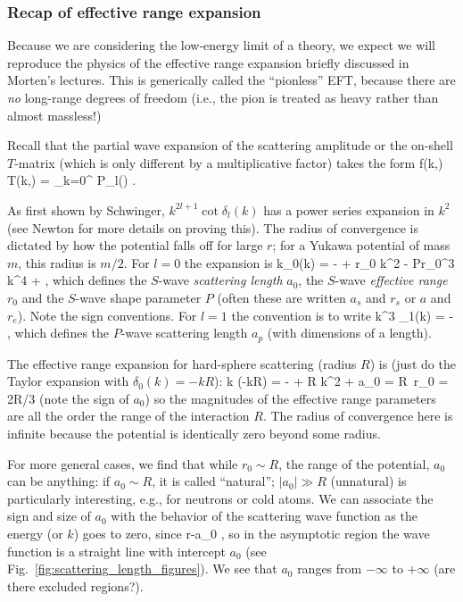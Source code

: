 \subsubsection{Recap of effective range expansion}

Because we are considering the low-energy limit of a theory, we expect
we will reproduce the physics of the effective range expansion briefly discussed in Morten's lectures. 
This is generically called the ``pionless'' EFT,  because there are \emph{no} 
long-range degrees of freedom (i.e., the pion is treated as heavy rather than almost massless!)

%
Recall that the partial wave expansion of the scattering amplitude or
the on-shell $T$-matrix (which is only different by a multiplicative factor) takes
the form
\beq
  f(k,\theta) \equiv {}T(k,\cos\theta) = \sum_{k=0}^\infty
     P_l(\cos\theta)
   \;.
\eeq


As first shown by Schwinger, $k^{2l+1}\cot\delta_l(k)$
has a power series expansion in $k^2$ (see Newton for more details on proving this).  
The radius of convergence is dictated by how the potential falls off for large $r$;
for a Yukawa potential of mass $m$, this radius is $m/2$.
For $l=0$ the expansion is
 \beq
   k\cot\delta_0(k) = - +  {\bl r_0} k^2
      - Pr_0^3 k^4 + \cdots \;,
 \eeq
which defines the $S$-wave \emph{scattering length} $a_0$, the $S$-wave
\emph{effective range} $r_0$ and the 
$S$-wave shape parameter $P$ (often these are written $a_s$ and $r_s$ or
$a$ and $r_e$).
Note the sign conventions.
For $l=1$ the convention is to write
\beq
  k^3 \cot \delta_1(k) = - \;,
\eeq
which defines the $P$-wave scattering length $a_p$ (with dimensions of a length).

The effective range expansion for hard-sphere scattering (radius $R$) is
(just do the Taylor expansion with $\delta_0(k) = -kR$):
 \beq
  k \cot(-kR) = - +  R k^2 + \cdots
      \quad \Longrightarrow \quad
      a_0 = R\, \quad r_0 = 2R/3
 \eeq
(note the sign of $a_0$) so the magnitudes of the
effective range parameters are all the order 
the range of the interaction $R$.  
The radius of convergence here is infinite because the potential is identically
zero beyond some radius.  

For more general cases, we find that
while $r_0 \sim R$, the range of the potential, $a_0$ can be
anything:
\bi
  \I if $a_0 \sim R$, it is called ``natural'';
  \I $|a_0| \gg R$ (unnatural) is particularly interesting,
   e.g., for neutrons or cold atoms.
\ei
We can associate the sign and size of $a_0$ with the behavior of the scattering wave
function as the energy (or $k$) goes to zero, since
\beq
      r-a_0
    \;,
\eeq
so in the asymptotic region the wave function is a straight line with intercept $a_0$
(see Fig.~\ref{fig:scattering_length_figures}). We see that 
$a_0$ ranges from $-\infty$ to $+\infty$ (are there excluded regions?).

